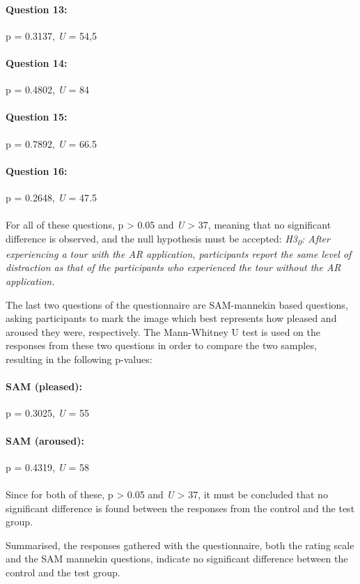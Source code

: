 \paragraph{Question 13:} p = 0.3137, \textit{U} = 54,5
\paragraph{Question 14:} p = 0.4802, \textit{U} = 84
\paragraph{Question 15:} p = 0.7892, \textit{U} = 66.5
\paragraph{Question 16:} p = 0.2648, \textit{U} = 47.5\\
\\
For all of these questions, p > 0.05 and \textit{U} > 37, meaning that no significant difference is observed, and the null hypothesis must be accepted: \textit{H3\textsubscript{0}: After experiencing a tour with the AR application, participants report the same level of distraction as that of the participants who experienced the tour without the AR application.}

The last two questions of the questionnaire are SAM-mannekin based questions, asking participants to mark the image which best represents how pleased and aroused they were, respectively. The Mann-Whitney U test is used on the responses from these two questions in order to compare the two samples, resulting in the following p-values:

\paragraph{SAM (pleased):} p = 0.3025, \textit{U} = 55
\paragraph{SAM (aroused):} p = 0.4319, \textit{U} = 58\\
\\
Since for both of these, p > 0.05 and \textit{U} > 37, it must be concluded that no significant difference is found between the responses from the control and the test group.

Summarised, the responses gathered with the questionnaire, both the rating scale and the SAM mannekin questions, indicate no significant difference between the control and the test group.


